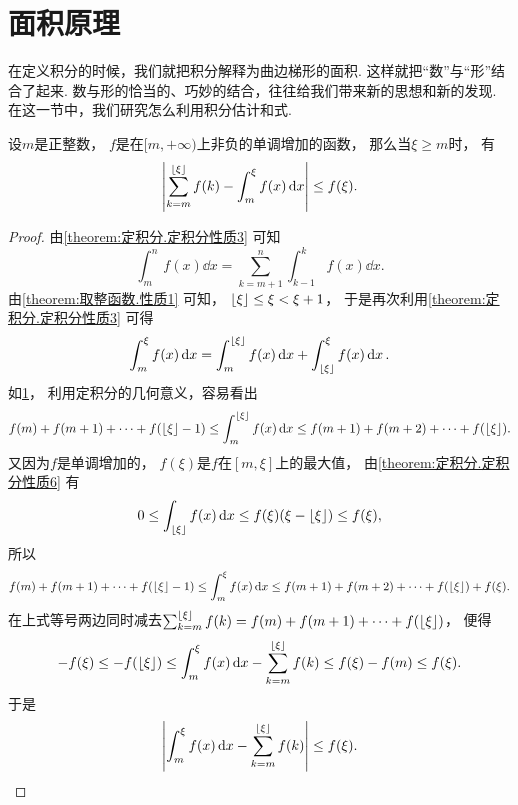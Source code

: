 \section{面积原理}
在定义积分的时候，我们就把积分解释为曲边梯形的面积.
这样就把“数”与“形”结合了起来.
数与形的恰当的、巧妙的结合，往往给我们带来新的思想和新的发现.
在这一节中，我们研究怎么利用积分估计和式.

\begin{figure}[ht]
	\centering
	\caption{}
	\label{figure:面积原理.定积分与曲边梯形面积的联系}
\end{figure}

\begin{theorem}
设\(m\)是正整数，
\(f\)是在\([m,+\infty)\)上非负的单调增加的函数，
那么当\(\xi \geq m\)时，
有\[
	\abs{
		\sum_{k=m}^{\lfloor\xi\rfloor} f(k)
		- \int_m^\xi f(x) \dd{x}
	} \leq f(\xi).
\]
\begin{proof}
由\cref{theorem:定积分.定积分性质3} 可知\[
	\int_m^n f(x) \dd{x}
	= \sum_{k=m+1}^n \int_{k-1}^k f(x) \dd{x}.
\]
由\cref{theorem:取整函数.性质1} 可知，
\(\lfloor\xi\rfloor \leq \xi < \xi + 1\)，
于是再次利用\cref{theorem:定积分.定积分性质3} 可得\[
	\int_m^\xi f(x) \dd{x}
	= \int_m^{\lfloor\xi\rfloor} f(x) \dd{x}
	+ \int_{\lfloor\xi\rfloor}^\xi f(x) \dd{x}.
\]
如\cref{figure:面积原理.定积分与曲边梯形面积的联系}，
利用定积分的几何意义，容易看出\[
	f(m) + f(m+1) + \dotsb + f(\lfloor\xi\rfloor-1)
	\leq \int_m^{\lfloor\xi\rfloor} f(x) \dd{x}
	\leq f(m+1) + f(m+2) + \dotsb + f(\lfloor\xi\rfloor).
\]
又因为\(f\)是单调增加的，
\(f(\xi)\)是\(f\)在\([m,\xi]\)上的最大值，
由\cref{theorem:定积分.定积分性质6} 有\[
	0 \leq \int_{\lfloor\xi\rfloor} f(x) \dd{x}
	\leq f(\xi) (\xi - \lfloor\xi\rfloor)
	\leq f(\xi),
\]
所以\[
	f(m) + f(m+1) + \dotsb + f(\lfloor\xi\rfloor-1)
	\leq \int_m^\xi f(x) \dd{x}
	\leq f(m+1) + f(m+2) + \dotsb + f(\lfloor\xi\rfloor) + f(\xi).
\]
在上式等号两边同时减去\(\sum_{k=m}^{\lfloor\xi\rfloor} f(k)
= f(m) + f(m+1) + \dotsb + f(\lfloor\xi\rfloor)\)，
便得\[
	-f(\xi)
	\leq -f(\lfloor\xi\rfloor)
	\leq \int_m^\xi f(x) \dd{x} - \sum_{k=m}^{\lfloor\xi\rfloor} f(k)
	\leq f(\xi) - f(m)
	\leq f(\xi).
\]
于是\[
	\abs{\int_m^\xi f(x) \dd{x} - \sum_{k=m}^{\lfloor\xi\rfloor} f(k)} \leq f(\xi).
	\qedhere
\]
\end{proof}
\end{theorem}

